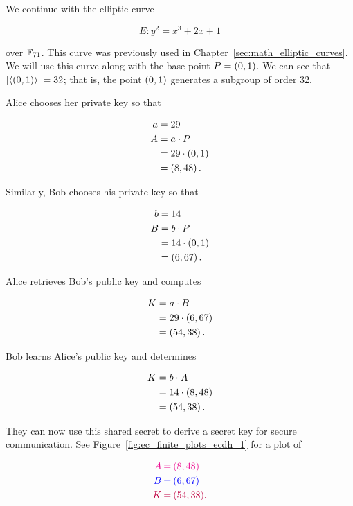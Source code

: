 \begin{example}
\label{example:ecc_ecdh_1}

We continue with the \gls{elliptic curve}

\begin{equation}
    E: y^{2} = x^{3} + 2x + 1
\end{equation}

\noindent
over $\mathbb{F}_{71}$.
This curve was previously used in Chapter~\ref{sec:math_elliptic_curves}.
We will use this curve along with the base point $P=\left( 0,1 \right)$.
We can see that $\left| \left\langle \left( 0,1 \right) \right\rangle \right|=32$;
that is, the point $\left( 0,1 \right)$ generates a \gls{subgroup} of order 32.

Alice chooses her private key so that

\begin{align}
    a &= 29 \nonumber\\
    A &= a\cdot P \nonumber\\
        &= 29\cdot\left( 0,1 \right) \nonumber\\
        &= \left( 8,48 \right).
\end{align}

\noindent
Similarly, Bob chooses his private key so that

\begin{align}
    b &= 14 \nonumber\\
    B &= b\cdot P \nonumber\\
        &= 14\cdot\left( 0,1 \right) \nonumber\\
        &= \left( 6,67 \right).
\end{align}

Alice retrieves Bob's public key and computes

\begin{align}
    K &= a\cdot B \nonumber\\
        &= 29\cdot\left( 6,67 \right) \nonumber\\
        &= \left( 54,38 \right).
\end{align}

\noindent
Bob learns Alice's public key and determines

\begin{align}
    K &= b\cdot A \nonumber\\
        &= 14\cdot\left( 8,48 \right) \nonumber\\
        &= \left( 54,38 \right).
\end{align}

\noindent
They can now use this \gls{shared secret} to derive a secret key
for secure communication.
See Figure~\ref{fig:ec_finite_plots_ecdh_1} for a plot of

\begin{align}
    \color{magenta}{A} &\mathbin{\color{magenta}{=}}
        \color{magenta}{\left( 8,48 \right)} \nonumber\\
    \color{blue}{B} &\mathbin{\color{blue}{=}}
        \color{blue}{\left( 6,67 \right)} \nonumber\\
    \color{purple}{K} &\mathbin{\color{purple}{=}}
        \color{purple}{\left( 54,38 \right)}.
\end{align}
\end{example}

